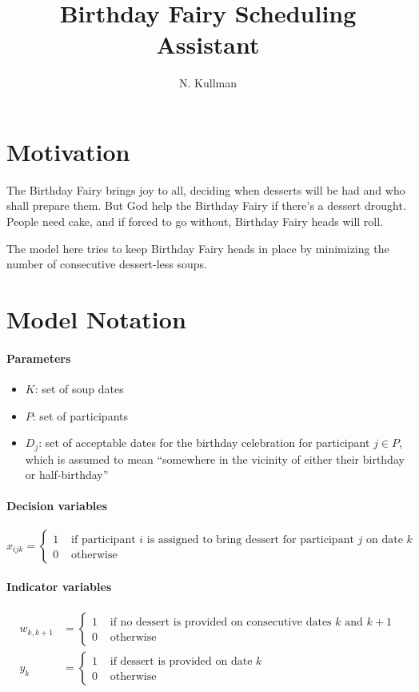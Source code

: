 \documentclass[11pt,letterpaper]{article}
\author{N. Kullman}
\title{Birthday Fairy Scheduling Assistant}
\begin{document}
\maketitle

\section*{Motivation}
The Birthday Fairy brings joy to all, deciding when desserts will be had and who shall prepare them. But God help the Birthday Fairy if there's a dessert drought. People need cake, and if forced to go without, Birthday Fairy heads will roll.

The model here tries to keep Birthday Fairy heads in place by minimizing the number of consecutive dessert-less soups.

\section*{Model Notation}
\paragraph{Parameters}
\begin{itemize}
\item $K$: set of soup dates
\item $P$: set of participants
\item $D_j$: set of acceptable dates for the birthday celebration for participant $j \in P$, which is assumed to mean ``somewhere in the vicinity of either their birthday or half-birthday''
\end{itemize}

\paragraph{Decision variables}
$$
x_{ijk} = \begin{cases}
1 &\text{ if participant $i$ is assigned to bring dessert for participant $j$ on date $k$}\\
0 &\text{ otherwise}
\end{cases}
$$

\paragraph{Indicator variables}
\begin{align*}
w_{k,k+1} &= \begin{cases}
1 &\text{ if no dessert is provided on consecutive dates $k$ and $k+1$}\\
0 &\text{ otherwise}
\end{cases}
\\
y_{k} &= \begin{cases}
1 &\text{ if dessert is provided on date $k$}\\
0 &\text{ otherwise}
\end{cases}
\end{align*}
\end{document}
